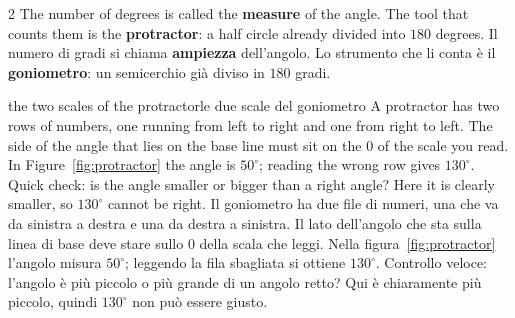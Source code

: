 \documentclass[10pt,a4paper,oneside]{book}
\newif\ifIT
\newenvironment{bi}%
  {\begin{paracol}{2}\global\ITfalse\selectlanguage{english}}%
  {\end{paracol}}
\newcommand{\IT}{\switchcolumn\global\ITtrue\selectlanguage{italian}}
\begin{document}
\begin{bi}
The number of degrees is called the \textbf{measure} of the angle. The tool that counts them is the \textbf{protractor}: a half circle already divided into $180$ degrees.
\IT
Il numero di gradi si chiama \textbf{ampiezza} dell'angolo. Lo strumento che li conta è il \textbf{goniometro}: un semicerchio già diviso in $180$ gradi.
\end{bi}

\begin{trap}{the two scales of the protractor}{le due scale del goniometro}
A protractor has two rows of numbers, one running from left to right and one from right to left. The side of the angle that lies on the base line must sit on the $0$ of the scale you read. In Figure~\ref{fig:protractor} the angle is $50^\circ$; reading the wrong row gives $130^\circ$. Quick check: is the angle smaller or bigger than a right angle? Here it is clearly smaller, so $130^\circ$ cannot be right.
\tcblower
Il goniometro ha due file di numeri, una che va da sinistra a destra e una da destra a sinistra. Il lato dell'angolo che sta sulla linea di base deve stare sullo $0$ della scala che leggi. Nella figura~\ref{fig:protractor} l'angolo misura $50^\circ$; leggendo la fila sbagliata si ottiene $130^\circ$. Controllo veloce: l'angolo è più piccolo o più grande di un angolo retto? Qui è chiaramente più piccolo, quindi $130^\circ$ non può essere giusto.
\end{trap}
\end{document}
